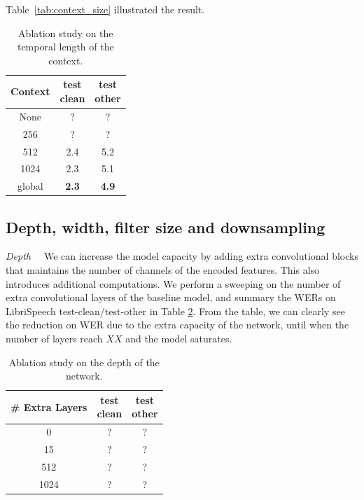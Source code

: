 Table~\ref{tab:context_size} illustrated the result.

\begin{table}
\begin{centering}
\begin{tabular}{c|cc}
\hline 
Context & \makecell{test\\ clean} & \makecell{test\\ other} \\
\hline 
\hline 
None & ? & ? \tabularnewline
256 & ? & ? \tabularnewline
512 & 2.4 & 5.2\tabularnewline
1024 & 2.3 & 5.1\tabularnewline
global & \textbf{2.3} & \textbf{4.9}\\\hline
\hline 
\end{tabular}
\par\end{centering}
\caption{Ablation study on the temporal length of the context. }
\label{tab:libri_speech_main}
\end{table}


\subsection{Depth, width, filter size and downsampling}
\textit{Depth\ \ } We can increase the model capacity by adding extra convolutional blocks that maintains the number of channels of the encoded features. This also introduces additional computations. We perform a sweeping on the number of extra convolutional layers of the baseline model, and summary the WERs on LibriSpeech test-clean/test-other in Table \ref{tab:ablation_depth}. From the table, we can clearly see the reduction on WER due to the extra capacity of the network, until when the number of layers reach $XX$ and the model saturates.
\begin{table}
\begin{centering}
\begin{tabular}{c|cc}
\hline 
\# Extra Layers & \makecell{test\\ clean} & \makecell{test\\ other} \\
\hline 
\hline 
0 & ? & ? \tabularnewline
15 & ? & ? \tabularnewline
512 & ? & ?\tabularnewline
1024 & ? & ?\tabularnewline
\hline 
\end{tabular}
\par\end{centering}
\caption{Ablation study on the depth of the network.}
\label{tab:ablation_depth}
\end{table}


